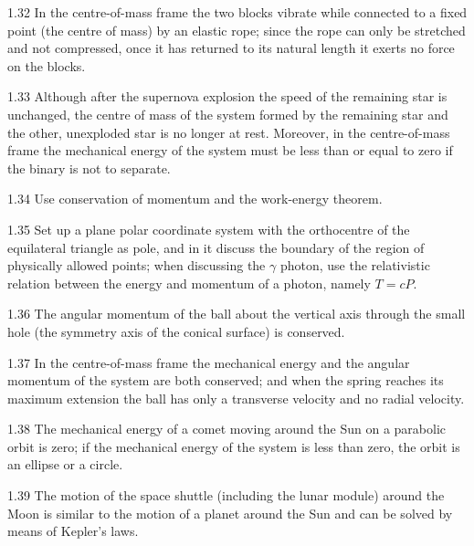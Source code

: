 \begin{hint}{1.32}
In the centre-of-mass frame the two blocks vibrate while connected to a fixed point (the centre of mass) by an elastic rope; since the rope can only be stretched and not compressed, once it has returned to its natural length it exerts no force on the blocks.
\end{hint}

\begin{hint}{1.33}
Although after the supernova explosion the speed of the remaining star is unchanged, the centre of mass of the system formed by the remaining star and the other, unexploded star is no longer at rest. Moreover, in the centre-of-mass frame the mechanical energy of the system must be less than or equal to zero if the binary is not to separate.
\end{hint}

\begin{hint}{1.34}
Use conservation of momentum and the work-energy theorem.
\end{hint}

\begin{hint}{1.35}
Set up a plane polar coordinate system with the orthocentre of the equilateral triangle as pole, and in it discuss the boundary of the region of physically allowed points; when discussing the $\gamma$ photon, use the relativistic relation between the energy and momentum of a photon, namely $T=cP$.
\end{hint}

\begin{hint}{1.36}
The angular momentum of the ball about the vertical axis through the small hole (the symmetry axis of the conical surface) is conserved.
\end{hint}

\begin{hint}{1.37}
In the centre-of-mass frame the mechanical energy and the angular momentum of the system are both conserved; and when the spring reaches its maximum extension the ball has only a transverse velocity and no radial velocity.
\end{hint}

\begin{hint}{1.38}
The mechanical energy of a comet moving around the Sun on a parabolic orbit is zero; if the mechanical energy of the system is less than zero, the orbit is an ellipse or a circle.
\end{hint}

\begin{hint}{1.39}
The motion of the space shuttle (including the lunar module) around the Moon is similar to the motion of a planet around the Sun and can be solved by means of Kepler's laws.
\end{hint}

